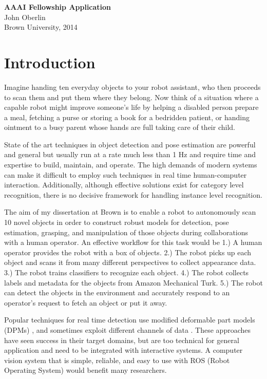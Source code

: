 \documentclass[12pt]{article}
\numberwithin{equation}{section}
\numberwithin{table}{section}
\numberwithin{figure}{section}
\begin{document}



\begin{center}
\textbf{\Large AAAI Fellowship Application}\\[12pt] 
John Oberlin\\
Brown University, 2014\\
\end{center}

\section{Introduction}
Imagine handing ten everyday objects to your robot assistant, who then proceeds to
scan them and put them where they belong. Now think of a situation where a capable
robot might improve someone's life by helping a disabled person prepare a meal,
fetching a purse or storing a book for a bedridden patient, or handing ointment
to a busy parent whose hands are full taking care of their child.

State of the art techniques in object detection and pose estimation
are powerful and general but usually run at a rate much less than 1 Hz and require
time and expertise to build, maintain, and operate. The high demands of modern systems
can make it difficult to employ such techniques in real time human-computer interaction.
Additionally, although effective solutions exist for category level recognition, there is no
decisive framework for handling instance level recognition.

The aim of my dissertation at Brown is to enable a robot
to autonomously scan 10 novel objects in order to construct robust models for detection,
pose estimation, grasping, and manipulation of those objects during collaborations with
a human operator. An effective workflow for this task would be 1.) A human operator provides
the robot with a box of objects. 2.) The robot picks up each object and scans it from many different
perspectives to collect appearance data. 3.) The robot trains classifiers to recognize each object. 
4.) The robot collects labels and metadata for the objects from Amazon Mechanical Turk. 5.) The
robot can detect the objects in the environment and accurately respond to an operator's request
to fetch an object or put it away.

Popular techniques for real time detection use modified deformable part models (DPMs) \cite{kostas1} \cite{forsyth1},
and sometimes exploit different channels of data \cite{dietr1} \cite{sliding1}.  
These approaches have seen success in their target domains, but are too technical for general
application and need to be integrated with interactive systems. A computer 
vision system that is simple, reliable, and easy to use with ROS (Robot Operating System)
would benefit many researchers.
\end{document}
